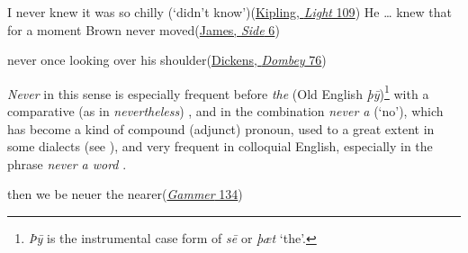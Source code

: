 \ea \label{ex:02-24}
\ea I never knew it was so chilly \phantom{x} (`didn't know')\hfill(\href{https://archive.org/details/lightthatfailed01kipluoft/page/130/mode/2up?q=%22I+never+knew+it+was+so+chilly%22&view=theater}{Kipling, \textit{Light} 109})
\ex He {\dots} knew that for a moment Brown never moved\hfill(\href{https://archive.org/details/softside00jamerich/page/n11/mode/2up?q=%22knew+that+for+a+minute+Brown+never+moved%22%22&view=theater}{James, \textit{Side} 6}) %
\z
\z

\ea \label{ex:02-26}
never once looking over his shoulder\hfill(\href{https://archive.org/details/dombeyson00dick_0/page/124/mode/2up?q=%22never+once+looking+over+his+shoulder%22&view=theater}{Dickens, \textit{Dombey} 76})
\z

\textit{Never} in this sense is especially frequent before \textit{the} (Old English \textit{þȳ})\footnote{\textit{Þȳ} %
is the instrumental case form of \textit{sē} or \textit{þæt} `the'. \eds} with a comparative (as in \textit{nevertheless}) , and in the combination \textit{never a} (`no'), which has become a kind of compound (adjunct) pronoun, used to a great extent in some dialects (see \citet[\href{https://archive.org/details/englishdialectdi04wrig/page/256/mode/2up?view=theater}{\textit{Never~a}}]{wright1905english4}), and very frequent in colloquial English, especially in the phrase \textit{never a word} .

\ea \label{ex:02-27}
then we be neuer the nearer\hfill(\href{https://archive.org/details/gammergvrtonsned0000mrsm/page/44/mode/2up?q=%22then+we+be+neuer+the+nearer%22&view=theater}{\textit{Gammer} 134})
\z

